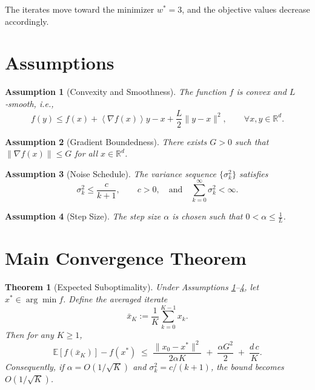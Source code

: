 \documentclass{article}
\newtheorem{theorem}{Theorem}
\newtheorem{assumption}{Assumption}
\newcommand{\EE}{\mathbb{E}}
\newcommand{\RR}{\mathbb{R}}
\newcommand{\inner}[1]{\left\langle#1\right\rangle}
\begin{document}
The iterates move toward the minimizer $w^{*}=3$, and the objective values
decrease accordingly.

\newpage
\section*{Assumptions}
\begin{assumption}[Convexity and Smoothness]\label{as:convexsmooth}
The function $f$ is convex and $L$‑smooth, i.e.,
\[
f(y)\le f(x)+\inner{\nabla f(x)}{y-x}+\frac{L}{2}\|y-x\|^{2},
\qquad\forall x,y\in\RR^{d}.
\tag{4}
\]
\end{assumption}
\begin{assumption}[Gradient Boundedness]\label{as:gradbound}
There exists $G>0$ such that $\|\nabla f(x)\|\le G$ for all $x\in\RR^{d}$.
\end{assumption}
\begin{assumption}[Noise Schedule]\label{as:noisesched}
The variance sequence $\{\sigma_{k}^{2}\}$ satisfies
\[
\sigma_{k}^{2}\le \frac{c}{k+1},\qquad c>0,\quad\text{and}\quad
\sum_{k=0}^{\infty}\sigma_{k}^{2}<\infty .
\tag{6}
\]
\end{assumption}
\begin{assumption}[Step Size]\label{as:stepsize}
The step size $\alpha$ is chosen such that $0<\alpha\le\frac{1}{L}$.
\end{assumption}

\section*{Main Convergence Theorem}
\begin{theorem}[Expected Suboptimality]\label{thm:main}
Under Assumptions \ref{as:convexsmooth}–\ref{as:stepsize},
let $x^{*}\in\arg\min f$.
Define the averaged iterate
\[
\bar{x}_{K}:=\frac{1}{K}\sum_{k=0}^{K-1}x_{k}.
\]
Then for any $K\ge1$,
\[
\EE\!\left[f(\bar{x}_{K})\right]-f(x^{*})
\;\le\;
\frac{\|x_{0}-x^{*}\|^{2}}{2\alpha K}
\;+\;
\frac{\alpha G^{2}}{2}
\;+\;
\frac{d\,c}{K}.
\tag{8}
\]
Consequently, if $\alpha=O(1/\sqrt{K})$ and $\sigma_{k}^{2}=c/(k+1)$,
the bound becomes $O(1/\sqrt{K})$.
\end{theorem}
\end{document}

